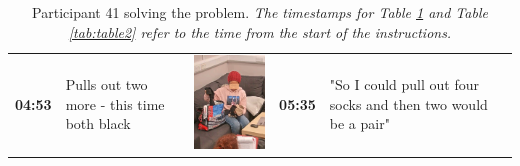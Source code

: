 \documentclass[twocolumn, serif, empirical, authordate]{jote-article}
\begin{document}
\begin{table}[ht!] \sffamily
\caption{Participant 41 solving the problem. \hspace{\textwidth}
\emph{The timestamps for Table \ref{tab:table1} and Table \ref{tab:table2} refer to the time from the start of the instructions. }}
\label{tab:table1}
\begin{mdframed}[linecolor=jotedark]
\vskip4pt
\renewcommand{\arraystretch}{2.5}
\begin{tabularx}{\linewidth}{@{} m{.05\linewidth} m{.2\linewidth} >{\raggedleft\arraybackslash}m{.19\linewidth}  m{.05\linewidth} m{.2\linewidth} >{\raggedleft\arraybackslash}m{.19\linewidth} }

\textbf{04:53}  &  Pulls out two more - this time both black  &  \includegraphics[height=.15\textheight, width=.8\linewidth]{media/image5.png}  &
 \textbf{05:35} & "So I could pull out four socks and then two would be a pair" & 

\end{tabularx}
\end{mdframed}
\end{table}
\end{document}
